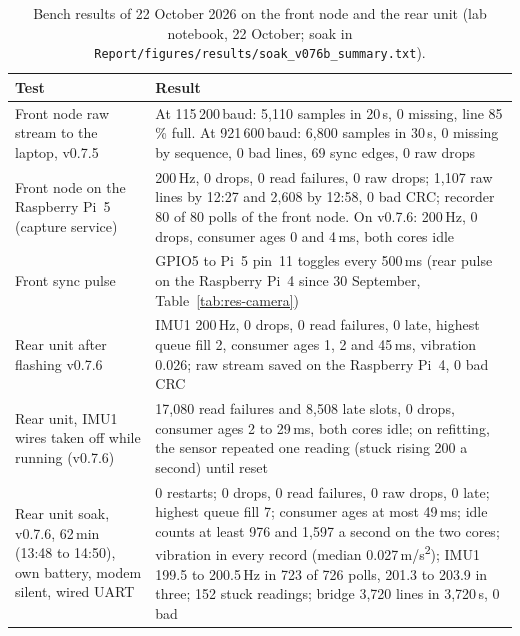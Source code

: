 \begin{table}[htbp]
\centering
\small
\caption[Bench results of 22 October 2026 on the front node and the rear unit (lab notebook, 22 October; soak in \texttt{Report/\allowbreak{}figures/\allowbreak{}results/\allowbreak{}soak\_\allowbreak{}v076b\_\allowbreak{}summary.txt})]{Bench results of 22 October 2026 on the front node and the rear unit (lab notebook, 22 October; soak in \texttt{Report/\allowbreak{}figures/\allowbreak{}results/\allowbreak{}soak\_\allowbreak{}v076b\_\allowbreak{}summary.txt}).}
\label{tab:res-twonode}
\begin{tabular}{|p{4.6cm}|p{9.2cm}|}
\hline
\textbf{Test} & \textbf{Result} \\ \hline
Front node raw stream to the laptop, v0.7.5 & At 115\,200\,baud: 5,110 samples in 20\,s, 0 missing, line 85\,\% full. At 921\,600\,baud: 6,800 samples in 30\,s, 0 missing by sequence, 0 bad lines, 69 sync edges, 0 raw drops \\ \hline
Front node on the Raspberry Pi~5 (capture service) & 200\,Hz, 0 drops, 0 read failures, 0 raw drops; 1,107 raw lines by 12:27 and 2,608 by 12:58, 0 bad CRC; recorder 80 of 80 polls of the front node. On v0.7.6: 200\,Hz, 0 drops, consumer ages 0 and 4\,ms, both cores idle \\ \hline
Front sync pulse & GPIO5 to Pi~5 pin~11 toggles every 500\,ms (rear pulse on the Raspberry Pi~4 since 30 September, Table~\ref{tab:res-camera}) \\ \hline
Rear unit after flashing v0.7.6 & IMU1 200\,Hz, 0 drops, 0 read failures, 0 late, highest queue fill 2, consumer ages 1, 2 and 45\,ms, vibration 0.026; raw stream saved on the Raspberry Pi~4, 0 bad CRC \\ \hline
Rear unit, IMU1 wires taken off while running (v0.7.6) & 17,080 read failures and 8,508 late slots, 0 drops, consumer ages 2 to 29\,ms, both cores idle; on refitting, the sensor repeated one reading (stuck rising 200 a second) until reset \\ \hline
Rear unit soak, v0.7.6, 62\,min (13:48 to 14:50), own battery, modem silent, wired UART & 0 restarts; 0 drops, 0 read failures, 0 raw drops, 0 late; highest queue fill 7; consumer ages at most 49\,ms; idle counts at least 976 and 1,597 a second on the two cores; vibration in every record (median 0.027\,m/s\textsuperscript{2}); IMU1 199.5 to 200.5\,Hz in 723 of 726 polls, 201.3 to 203.9 in three; 152 stuck readings; bridge 3,720 lines in 3,720\,s, 0 bad \\ \hline
\end{tabular}
\end{table}

